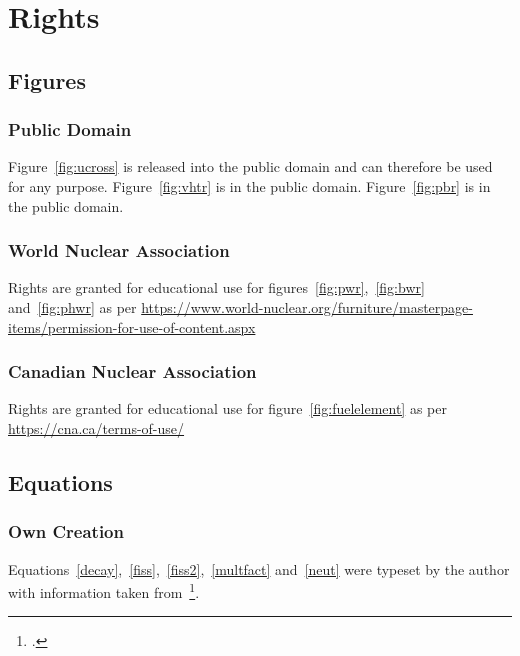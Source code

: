 \chapter{Rights}
\section{Figures}
\subsection{Public Domain}
Figure~\ref{fig:ucross} is released into the public domain and can therefore be used for any purpose.
Figure~\ref{fig:vhtr} is in the public domain.
Figure~\ref{fig:pbr} is in the public domain.
\subsection{World Nuclear Association}
Rights are granted for educational use for figures~\ref{fig:pwr},~\ref{fig:bwr} and~\ref{fig:phwr}
as per \url{https://www.world-nuclear.org/furniture/masterpage-items/permission-for-use-of-content.aspx}
\subsection{Canadian Nuclear Association}
Rights are granted for educational use for figure~\ref{fig:fuelelement} as per
\url{https://cna.ca/terms-of-use/}
\section{Equations}
\subsection{Own Creation}
Equations~\ref{decay},~\ref{fiss},~\ref{fiss2},~\ref{multfact} and~\ref{neut} were typeset by the author with
information taken from~\footcite{ReactorDesign}.